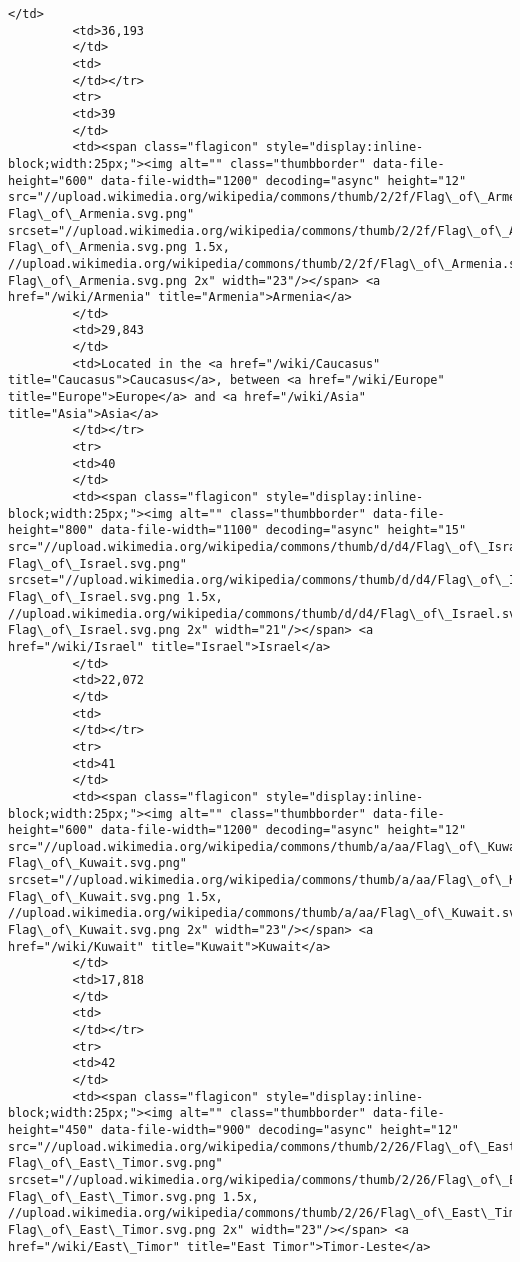 \documentclass[11pt]{article}
\begin{document}
\begin{Verbatim}[commandchars=\\\{\}]
         </td>
         <td>36,193
         </td>
         <td>
         </td></tr>
         <tr>
         <td>39
         </td>
         <td><span class="flagicon" style="display:inline-block;width:25px;"><img alt="" class="thumbborder" data-file-height="600" data-file-width="1200" decoding="async" height="12" src="//upload.wikimedia.org/wikipedia/commons/thumb/2/2f/Flag\_of\_Armenia.svg/23px-Flag\_of\_Armenia.svg.png" srcset="//upload.wikimedia.org/wikipedia/commons/thumb/2/2f/Flag\_of\_Armenia.svg/35px-Flag\_of\_Armenia.svg.png 1.5x, //upload.wikimedia.org/wikipedia/commons/thumb/2/2f/Flag\_of\_Armenia.svg/46px-Flag\_of\_Armenia.svg.png 2x" width="23"/></span> <a href="/wiki/Armenia" title="Armenia">Armenia</a>
         </td>
         <td>29,843
         </td>
         <td>Located in the <a href="/wiki/Caucasus" title="Caucasus">Caucasus</a>, between <a href="/wiki/Europe" title="Europe">Europe</a> and <a href="/wiki/Asia" title="Asia">Asia</a>
         </td></tr>
         <tr>
         <td>40
         </td>
         <td><span class="flagicon" style="display:inline-block;width:25px;"><img alt="" class="thumbborder" data-file-height="800" data-file-width="1100" decoding="async" height="15" src="//upload.wikimedia.org/wikipedia/commons/thumb/d/d4/Flag\_of\_Israel.svg/21px-Flag\_of\_Israel.svg.png" srcset="//upload.wikimedia.org/wikipedia/commons/thumb/d/d4/Flag\_of\_Israel.svg/32px-Flag\_of\_Israel.svg.png 1.5x, //upload.wikimedia.org/wikipedia/commons/thumb/d/d4/Flag\_of\_Israel.svg/41px-Flag\_of\_Israel.svg.png 2x" width="21"/></span> <a href="/wiki/Israel" title="Israel">Israel</a>
         </td>
         <td>22,072
         </td>
         <td>
         </td></tr>
         <tr>
         <td>41
         </td>
         <td><span class="flagicon" style="display:inline-block;width:25px;"><img alt="" class="thumbborder" data-file-height="600" data-file-width="1200" decoding="async" height="12" src="//upload.wikimedia.org/wikipedia/commons/thumb/a/aa/Flag\_of\_Kuwait.svg/23px-Flag\_of\_Kuwait.svg.png" srcset="//upload.wikimedia.org/wikipedia/commons/thumb/a/aa/Flag\_of\_Kuwait.svg/35px-Flag\_of\_Kuwait.svg.png 1.5x, //upload.wikimedia.org/wikipedia/commons/thumb/a/aa/Flag\_of\_Kuwait.svg/46px-Flag\_of\_Kuwait.svg.png 2x" width="23"/></span> <a href="/wiki/Kuwait" title="Kuwait">Kuwait</a>
         </td>
         <td>17,818
         </td>
         <td>
         </td></tr>
         <tr>
         <td>42
         </td>
         <td><span class="flagicon" style="display:inline-block;width:25px;"><img alt="" class="thumbborder" data-file-height="450" data-file-width="900" decoding="async" height="12" src="//upload.wikimedia.org/wikipedia/commons/thumb/2/26/Flag\_of\_East\_Timor.svg/23px-Flag\_of\_East\_Timor.svg.png" srcset="//upload.wikimedia.org/wikipedia/commons/thumb/2/26/Flag\_of\_East\_Timor.svg/35px-Flag\_of\_East\_Timor.svg.png 1.5x, //upload.wikimedia.org/wikipedia/commons/thumb/2/26/Flag\_of\_East\_Timor.svg/46px-Flag\_of\_East\_Timor.svg.png 2x" width="23"/></span> <a href="/wiki/East\_Timor" title="East Timor">Timor-Leste</a>

\end{Verbatim}
\end{document}
